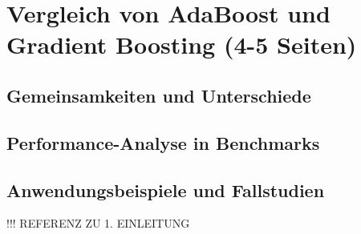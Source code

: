 \section{Vergleich von AdaBoost und Gradient Boosting (4-5 Seiten)}
\subsection{Gemeinsamkeiten und Unterschiede}
\subsection{Performance-Analyse in Benchmarks}
\subsection{Anwendungsbeispiele und Fallstudien}


!!! REFERENZ ZU 1. EINLEITUNG
